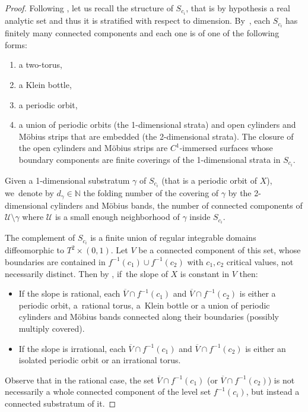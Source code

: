 \documentclass[JEP,XML,SOM,Unicode,NoEqCountersInSection,NoFloatCountersInSection,published]{cedram}
\theoremstyle{definition}
\begin{document}
\begin{proof}
Following \cite{CV2}, let us recall the structure of $S_{c_i}$, that is by hypothesis a real analytic set and thus it is stratified with respect to dimension. By~\cite[Prop.\,2.6]{CV2}, each $S_{c_i}$ has finitely many connected components and each one is of one of the following forms:
\begin{enumerate}
\item a two-torus,
\item a Klein bottle,
\item a periodic orbit,
\item a union of periodic orbits (the 1-dimensional strata) and open cylinders and Möbius strips that are embedded (the 2-dimensional strata). The closure of the open cylinders and Möbius strips are $C^1$-immersed surfaces whose boundary components are finite coverings of the 1-dimensional strata in $S_{c_i}$.
\end{enumerate}
Given a 1-dimensional substratum $\gamma$ of $S_{c_i}$ (that is a periodic orbit of $X$), we~denote by $d_{\gamma}\in \mathbb{N}$ the folding number of the covering of $\gamma$ by the 2-dimensional cylinders and Möbius bands, \ie the number of connected components of $\mathcal{U}\setminus \gamma$ where $\mathcal{U}$ is a small enough neighborhood of $\gamma$ inside $S_{c_i}$.

The complement of $S_{c_i}$ is a finite union of regular integrable domains diffeomorphic to $T^2\times (0,1)$. Let $V$ be a connected component of this set, whose boundaries are contained in $f^{-1}(c_1)\cup f^{-1}(c_2)$ with $c_1,c_2$ critical values, not necessarily distinct. Then by \cite[Lem.\,3.4]{CV2}, if~the slope of $X$ is constant in $V$ then:
\begin{itemize}
\item
If the slope is rational, each $\overline{V}\cap f^{-1}(c_1)$ and $\overline{V}\cap f^{-1}(c_2)$ is either a periodic orbit, a~rational torus, a~Klein bottle or a union of periodic cylinders and Möbius bands connected along their boundaries (possibly multiply covered).
\item
If the slope is irrational, each $\overline{V}\cap f^{-1}(c_1)$ and $\overline{V}\cap f^{-1}(c_2)$ is either an isolated periodic orbit or an irrational torus.
\end{itemize}
Observe that in the rational case, the set $\overline{V}\cap f^{-1}(c_1)$ (or $\overline{V}\cap f^{-1}(c_2)$) is not necessarily a whole connected component of the level set $f^{-1}(c_i)$, but instead a connected substratum of it.


\end{proof}
\end{document}

